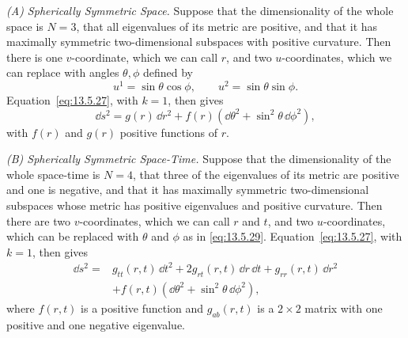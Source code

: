\medskip
\noindent\emph{(A) Spherically Symmetric Space.}
Suppose that the dimensionality of the whole space is \(N=3\), that all
eigenvalues of its metric are positive, and that it has maximally symmetric
two-dimensional subspaces with positive curvature. Then there is one
\(v\)-coordinate, which we can call \(r\), and two \(u\)-coordinates, which
we can replace with angles \(\theta,\phi\) defined by
\begin{equation}
  u^1=\sin\theta\cos\phi,
  \qquad
  u^2=\sin\theta\sin\phi.
  \tag{13.5.29}\label{eq:13.5.29}
\end{equation}
Equation~\eqref{eq:13.5.27}, with \(k=1\), then gives
\begin{equation}
  \dd s^2
  =
  g(r)\,\dd r^2
  +f(r)
  \left(
    \dd\theta^2+\sin^2\theta\,\dd\phi^2
  \right),
  \tag{13.5.30}\label{eq:13.5.30}
\end{equation}
with \(f(r)\) and \(g(r)\) positive functions of \(r\).

\medskip
\noindent\emph{(B) Spherically Symmetric Space-Time.}
Suppose that the dimensionality of the whole space-time is \(N=4\), that
three of the eigenvalues of its metric are positive and one is negative, and
that it has maximally symmetric two-dimensional subspaces whose metric has
positive eigenvalues and positive curvature. Then there are two
\(v\)-coordinates, which we can call \(r\) and \(t\), and two
\(u\)-coordinates, which can be replaced with \(\theta\) and \(\phi\) as in
\eqref{eq:13.5.29}. Equation~\eqref{eq:13.5.27}, with \(k=1\), then gives
\begin{equation}
  \begin{aligned}
  \dd s^2={}&
  g_{tt}(r,t)\,\dd t^2
  +2g_{rt}(r,t)\,\dd r\,\dd t
  +g_{rr}(r,t)\,\dd r^2
  \\
  &+f(r,t)
  \left(
    \dd\theta^2+\sin^2\theta\,\dd\phi^2
  \right),
  \end{aligned}
  \tag{13.5.31}\label{eq:13.5.31}
\end{equation}
where \(f(r,t)\) is a positive function and \(g_{ab}(r,t)\) is a
\(2\times2\) matrix with one positive and one negative eigenvalue.

